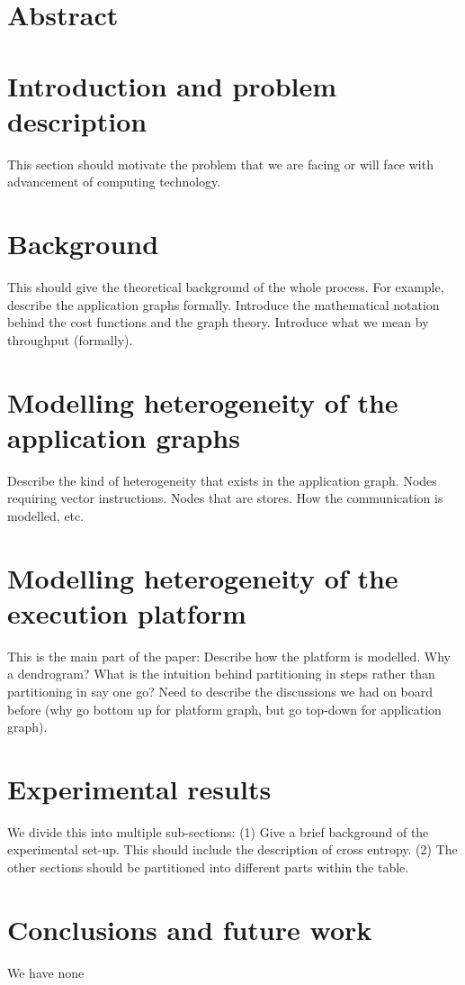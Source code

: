 \documentclass[10pt]{article}
\begin{document}
\section{Abstract}
\label{sec:abstract-2}

\section{Introduction and problem description}
\label{sec:intr-probl-descr}

This section should motivate the problem that we are facing or will face
with advancement of computing technology.

\section{Background}
\label{sec:background}

This should give the theoretical background of the whole process. For
example, describe the application graphs formally. Introduce the
mathematical notation behind the cost functions and the graph
theory. Introduce what we mean by throughput (formally).

\section{Modelling heterogeneity of the application graphs}
\label{sec:model-heter-appl}

Describe the kind of heterogeneity that exists in the application
graph. Nodes requiring vector instructions. Nodes that are stores. How
the communication is modelled, etc.

\section{Modelling heterogeneity of the execution platform}
\label{sec:model-heter-exec}

This is the main part of the paper: Describe how the platform is
modelled. Why a dendrogram? What is the intuition behind partitioning in
steps rather than partitioning in say one go? Need to describe the
discussions we had on board before (why go bottom up for platform graph,
but go top-down for application graph).

\section{Experimental results}
\label{sec:experimental-results}

We divide this into multiple sub-sections: (1) Give a brief background
of the experimental set-up. This should include the description of cross
entropy. (2) The other sections should be partitioned into different
parts within the table.


\section{Conclusions and future work}
\label{sec:concl-future-work}

We have none
\end{document}
